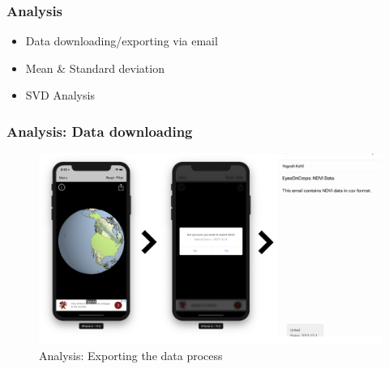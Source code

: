 \begin{frame}
\frametitle{Analysis}
\begin{itemize}
    \item Data downloading/exporting via email
    \item Mean \& Standard deviation
    \item SVD Analysis
\end{itemize}
\end{frame}

\begin{frame}
\frametitle{Analysis: Data downloading}
 \begin{figure}[H]
            \centering
            \includegraphics[width=0.95\linewidth]{final/figures/email_feature.png}
            \caption{Analysis: Exporting the data process}
    \end{figure}
\end{frame}

